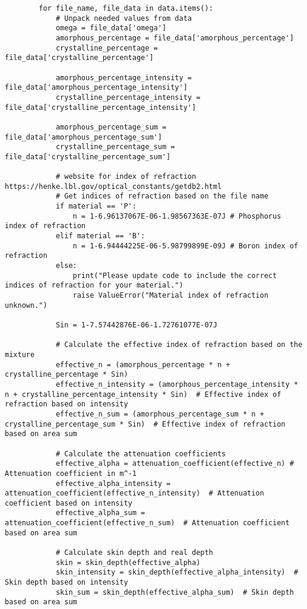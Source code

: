 \begin{lstlisting}
        for file_name, file_data in data.items():
            # Unpack needed values from data
            omega = file_data['omega']
            amorphous_percentage = file_data['amorphous_percentage']
            crystalline_percentage = file_data['crystalline_percentage']

            amorphous_percentage_intensity = file_data['amorphous_percentage_intensity']
            crystalline_percentage_intensity = file_data['crystalline_percentage_intensity']

            amorphous_percentage_sum = file_data['amorphous_percentage_sum']
            crystalline_percentage_sum = file_data['crystalline_percentage_sum']

            # website for index of refraction https://henke.lbl.gov/optical_constants/getdb2.html
            # Get indices of refraction based on the file name
            if material == 'P':
                n = 1-6.96137067E-06-1.98567363E-07J # Phosphorus index of refraction
            elif material == 'B':
                n = 1-6.94444225E-06-5.98799899E-09J # Boron index of refraction
            else:
                print("Please update code to include the correct indices of refraction for your material.")
                raise ValueError("Material index of refraction unknown.")

            Sin = 1-7.57442876E-06-1.72761077E-07J

            # Calculate the effective index of refraction based on the mixture
            effective_n = (amorphous_percentage * n + crystalline_percentage * Sin)
            effective_n_intensity = (amorphous_percentage_intensity * n + crystalline_percentage_intensity * Sin)  # Effective index of refraction based on intensity
            effective_n_sum = (amorphous_percentage_sum * n + crystalline_percentage_sum * Sin)  # Effective index of refraction based on area sum

            # Calculate the attenuation coefficients
            effective_alpha = attenuation_coefficient(effective_n) # Attenuation coefficient in m^-1
            effective_alpha_intensity = attenuation_coefficient(effective_n_intensity)  # Attenuation coefficient based on intensity
            effective_alpha_sum = attenuation_coefficient(effective_n_sum)  # Attenuation coefficient based on area sum

            # Calculate skin depth and real depth
            skin = skin_depth(effective_alpha)
            skin_intensity = skin_depth(effective_alpha_intensity)  # Skin depth based on intensity
            skin_sum = skin_depth(effective_alpha_sum)  # Skin depth based on area sum


\end{lstlisting}
